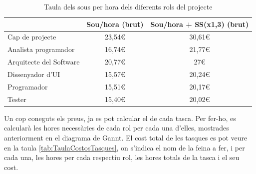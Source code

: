 \documentclass[a4paper]{article}
\begin{document}
\begin{table}[H]
    \begin{center}
        \begin{tabular}{|l|c|c|}
            \hline
            \rowcolor[HTML]{9B9B9B} 
            \multicolumn{1}{|c|}{\cellcolor[HTML]{9B9B9B}{\color[HTML]{000000} \textbf{Rol}}} & {\color[HTML]{000000} \textbf{Sou/hora (brut)}} & {\color[HTML]{000000} \textbf{Sou/hora + SS(x1,3) (brut)}} \\ \hline
            {\color[HTML]{000000} Cap de projecte}                                            & {\color[HTML]{000000} 23,54€}                   & {\color[HTML]{000000} 30,61€}                              \\ \hline
            {\color[HTML]{000000} Analista programador}                                       & {\color[HTML]{000000} 16,74€}                   & {\color[HTML]{000000} 21,77€}                              \\ \hline
            {\color[HTML]{000000} Arquitecte del Software}                                    & {\color[HTML]{000000} 20,77€}                   & {\color[HTML]{000000} 27€}                                 \\ \hline
            {\color[HTML]{000000} Dissenyador d'UI}                                           & {\color[HTML]{000000} 15,57€}                   & {\color[HTML]{000000} 20,24€}                              \\ \hline
            {\color[HTML]{000000} Programador}                                                & {\color[HTML]{000000} 15,51€}                   & {\color[HTML]{000000} 20,17€}                              \\ \hline
            {\color[HTML]{000000} Tester}                                                     & {\color[HTML]{000000} 15,40€}                   & {\color[HTML]{000000} 20,02€}                              \\ \hline
        \end{tabular}
        \caption{Taula dels sous per hora dels diferents rols del projecte}
        \label{tab:TaulaSouRols}
    \end{center}
\end{table}

Un cop coneguts els preus, ja es pot calcular el de cada tasca. Per fer-ho, es calcularà les hores necessàries de cada rol per cada una d'elles, mostrades anteriorment en el diagrama de Gannt. El cost total de les tasques es pot veure en la taula \ref{tab:TaulaCostosTasques}, on s'indica el nom de la feina a fer, i per cada una, les hores per cada respectiu rol, les hores totals de la tasca i el seu cost.
\end{document}
